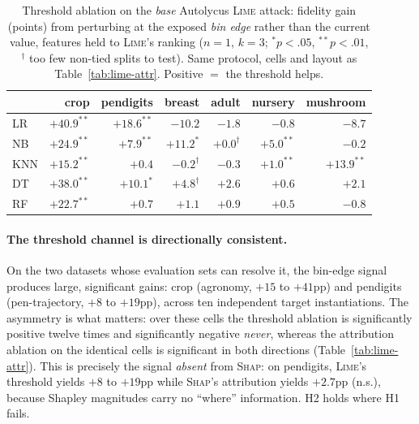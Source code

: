 \documentclass[sigconf,anonymous,review]{acmart}
\begin{document}
\begin{table}[t]
\centering
\caption{Threshold ablation on the \emph{base} Autolycus \textsc{Lime} attack: fidelity gain (points) from perturbing at the
exposed \emph{bin edge} rather than the current value, features held to \textsc{Lime}'s ranking
($n{=}1$, $k{=}3$; $^{*}p{<}.05$, $^{**}p{<}.01$, $^{\dag}$ too few non-tied splits to test). Same
protocol, cells and layout as Table~\ref{tab:lime-attr}. Positive $=$ the threshold helps.}
\label{tab:lime-threshold}
\setlength{\tabcolsep}{3pt}
\begin{tabular}{lrrrrrr}
\toprule
 & crop & pendigits & breast & adult & nursery & mushroom \\
\midrule
LR  & $+40.9^{**}$ & $+18.6^{**}$ & $-10.2$        & $-1.8$        & $-0.8$      & $-8.7$ \\
NB  & $+24.9^{**}$ & $+7.9^{**}$  & $+11.2^{*}$    & $+0.0^{\dag}$ & $+5.0^{**}$ & $-0.2$ \\
KNN & $+15.2^{**}$ & $+0.4$       & $-0.2^{\dag}$  & $-0.3$        & $+1.0^{**}$ & $+13.9^{**}$ \\
DT  & $+38.0^{**}$ & $+10.1^{*}$  & $+4.8^{\dag}$  & $+2.6$        & $+0.6$      & $+2.1$ \\
RF  & $+22.7^{**}$ & $+0.7$       & $+1.1$         & $+0.9$        & $+0.5$      & $-0.8$ \\
\bottomrule
\end{tabular}
\end{table}

\paragraph{The threshold channel is directionally consistent.} On the two datasets whose evaluation
sets can resolve it, the bin-edge signal produces large, significant gains: crop (agronomy, $+15$ to
$+41$pp) and pendigits (pen-trajectory, $+8$ to $+19$pp), across ten independent target
instantiations. The asymmetry is what matters: over these cells the threshold ablation is
significantly positive twelve times and significantly negative \emph{never}, whereas the attribution
ablation on the identical cells is significant in both directions
(Table~\ref{tab:lime-attr}). This is precisely the signal \emph{absent} from \textsc{Shap}: on
pendigits, \textsc{Lime}'s threshold yields $+8$ to $+19$pp while \textsc{Shap}'s attribution yields
$+2.7$pp (n.s.), because Shapley magnitudes carry no ``where'' information. H2 holds where H1 fails.
\end{document}
